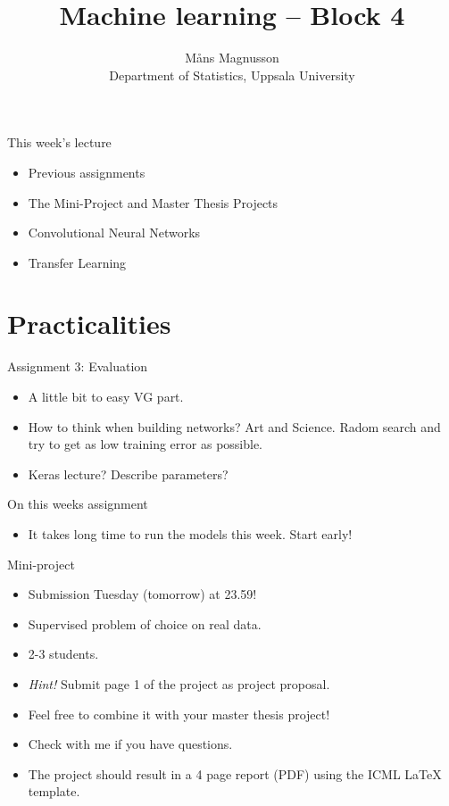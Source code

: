 \documentclass[10pt]{beamer}
\title[]{{\color{black}Machine learning -- Block 4}}
\author[]{M{\aa}ns Magnusson\\Department of Statistics, Uppsala University}
\date{\currentsemester}
\begin{document}
\frame{\titlepage
}



\begin{frame}{This week's lecture}
\begin{itemize}
\item Previous assignments
\item The Mini-Project and Master Thesis Projects
\item Convolutional Neural Networks
\item Transfer Learning
\end{itemize}
\end{frame}




\section{Practicalities}

\begin{frame}{Assignment 3: Evaluation}

\begin{itemize}
\item A little bit to easy VG part.
\item How to think when building networks? Art and Science. Radom search and try to get as low training error as possible.
\item Keras lecture? Describe parameters?
\end{itemize}

\end{frame}

\begin{frame}{On this weeks assignment}
\begin{itemize}
\item It takes long time to run the models this week. Start early!
\end{itemize}
\end{frame}


\begin{frame}{Mini-project}

\begin{itemize}
\item Submission Tuesday (tomorrow) at 23.59!\pause
\item {\color{uured} Supervised} problem of choice on {\color{uured} real data}.\pause
\item 2-3 students.\pause
\item \emph{Hint!} Submit page 1 of the project as project proposal.
\item Feel free to combine it with your master thesis project!
\item Check with me if you have questions.
\item The project should result in a 4 page report (PDF) using the {\color{uured} ICML LaTeX template}.
\end{itemize}
\end{frame}
\end{document}
